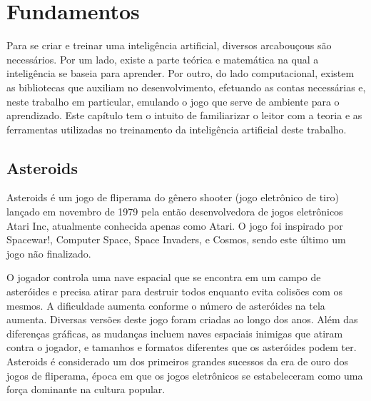 \chapter{Fundamentos}
\label{cap:fundamentos}

Para se criar e treinar uma inteligência artificial, diversos arcabouçous são necessários. Por um lado, existe a parte teórica e matemática na qual a inteligência se baseia para aprender. Por outro, do lado computacional, existem as bibliotecas que auxiliam no desenvolvimento, efetuando as contas necessárias e, neste trabalho em particular, emulando o jogo que serve de ambiente para o aprendizado.
Este capítulo tem o intuito de familiarizar o leitor com a teoria e as ferramentas utilizadas no treinamento da inteligência artificial deste trabalho.

\section{Asteroids}
\label{sec:asteroids}

Asteroids é um jogo de fliperama do gênero shooter (jogo eletrônico de tiro) lançado em novembro de 1979 pela então desenvolvedora de jogos eletrônicos Atari Inc, atualmente conhecida apenas como Atari. O jogo foi inspirado por Spacewar!, Computer Space, Space Invaders, e Cosmos, sendo este último um jogo não finalizado.

O jogador controla uma nave espacial que se encontra em um campo de asteróides e precisa atirar para destruir todos enquanto evita colisões com os mesmos. A dificuldade aumenta conforme o número de asteróides na tela aumenta.
Diversas versões deste jogo foram criadas ao longo dos anos. Além das diferenças gráficas, as mudanças incluem naves espaciais inimigas que atiram contra o jogador, e tamanhos e formatos diferentes que os asteróides podem ter.
Asteroids é considerado um dos primeiros grandes sucessos da era de ouro dos jogos de fliperama, época em que os jogos eletrônicos se estabeleceram como uma força dominante na cultura popular. 

